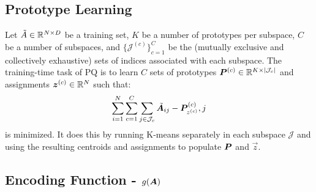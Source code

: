 \subsection{Prototype Learning}

Let $\tilde{A} \in \mathbb{R}^{N \times D}$ be a training set, $K$ be a number of prototypes per subspace, $C$ be a number of subspaces, and $\{\mathcal{J}^{(c)}\}_{c=1}^C$ be the (mutually exclusive and collectively exhaustive) sets of indices associated with each subspace. The training-time task of PQ is to learn $C$ sets of prototypes $\bm{P}^{(c)} \in \mathbb{R}^{K \times |\mathcal{J}_c|}$ and assignments $\bm{z}^{(c)} \in \mathbb{R}^{N}$ such that:
\begin{align}
    \sum_{i=1}^N \sum_{c=1}^C \sum_{j\in \mathcal{J}_c} \tilde{\bm{A}}_{ij} - \bm{P}^{(c)}_{z^{(c)}},j
\end{align}
is minimized. It does this by running K-means separately in each subspace $\mathcal{J}$ and using the resulting centroids and assignments to populate $\bm{P}$ and $\vec{z}$.




\subsection{Encoding Function - $g(\bm{A})$}

